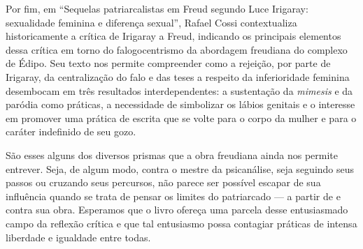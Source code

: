 Por fim, em ``Sequelas patriarcalistas em Freud segundo Luce Irigaray:
sexualidade feminina e diferença sexual'', Rafael Cossi contextualiza
historicamente a crítica de Irigaray a Freud, indicando os principais
elementos dessa crítica em torno do falogocentrismo da abordagem
freudiana do complexo de Édipo. Seu texto nos permite compreender como a
rejeição, por parte de Irigaray, da centralização do falo e das teses a
respeito da inferioridade feminina desembocam em três resultados
interdependentes: a sustentação da \emph{mimesis} e da paródia como
práticas, a necessidade de simbolizar os lábios genitais e o interesse
em promover uma prática de escrita que se volte para o corpo da mulher e
para o caráter indefinido de seu gozo.

São esses alguns dos diversos prismas que a obra freudiana ainda nos
permite entrever. Seja, de algum modo, contra o mestre da psicanálise, seja seguindo seus passos ou cruzando seus percursos, não parece ser possível escapar de sua influência quando se trata de pensar os limites do patriarcado --- a partir de e contra sua obra.
Esperamos que o livro ofereça uma parcela desse
entusiasmado campo da reflexão crítica e que tal entusiasmo possa
contagiar práticas de intensa liberdade e igualdade entre todas.
